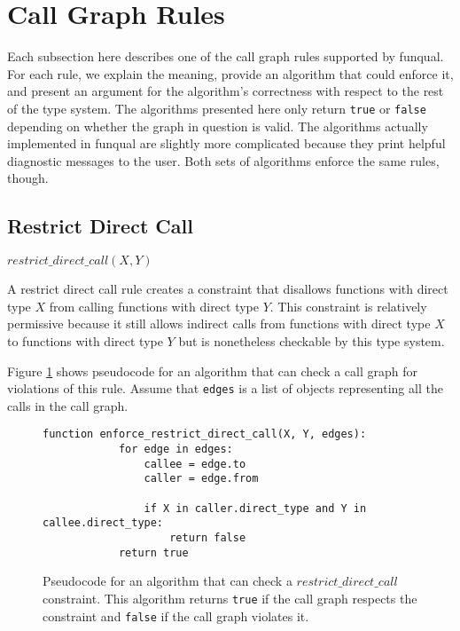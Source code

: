 \section{Call Graph Rules}\label{sec:rules:rules}


Each subsection here describes one of the call graph rules supported by funqual.  For each rule, we explain the meaning, provide an algorithm that could enforce it, and present an argument for the algorithm's correctness with respect to the rest of the type system.  The algorithms presented here only return \lstinline{true} or \lstinline{false} depending on whether the graph in question is valid.  The algorithms actually implemented in funqual are slightly more complicated because they print helpful diagnostic messages to the user.  Both sets of algorithms enforce the same rules, though.  

\subsection{Restrict Direct Call}

\begin{center}
    $restrict\_direct\_call(X, Y)$
\end{center}

A restrict direct call rule creates a constraint that disallows functions with direct type $X$ from calling functions with direct type $Y$.  This constraint is relatively permissive because it still allows indirect calls from functions with direct type $X$ to functions with direct type $Y$ but is nonetheless checkable by this type system.

Figure \ref{lst:rules:rules:restrict_direct_call} shows pseudocode for an algorithm that can check a call graph for violations of this rule.  Assume that \lstinline{edges} is a list of objects representing all the calls in the call graph.  

\begin{figure}
    \begin{lstlisting}[gobble=8]
        function enforce_restrict_direct_call(X, Y, edges):
            for edge in edges:
                callee = edge.to
                caller = edge.from

                if X in caller.direct_type and Y in callee.direct_type:
                    return false
            return true
    \end{lstlisting}
    \caption{Pseudocode for an algorithm that can check a $restrict\_direct\_call$ constraint.  This algorithm returns \lstinline{true} if the call graph respects the constraint and \lstinline{false} if the call graph violates it.}
    \label{lst:rules:rules:restrict_direct_call}
\end{figure}

